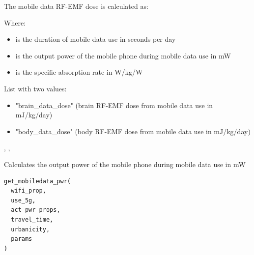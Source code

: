 \documentclass[a4paper]{book}
\begin{document}
%
\begin{Details}
The mobile data RF-EMF dose is calculated as:

Where:
\begin{itemize}

\item{}  is the duration of mobile data use in seconds per day
\item{}  is the output power of the mobile phone during mobile data use in mW
\item{}  is the specific absorption rate in W/kg/W

\end{itemize}

\end{Details}
%
\begin{Value}
List with two values:
\begin{itemize}

\item{} "brain\_data\_dose" (brain RF-EMF dose from mobile data use in mJ/kg/day)
\item{} "body\_data\_dose" (body RF-EMF dose from mobile data use in mJ/kg/day)

\end{itemize}

\end{Value}
%
\begin{SeeAlso}
, , 
\end{SeeAlso}
%
\begin{Description}
Calculates the output power of the mobile phone during mobile data use in mW
\end{Description}
%
\begin{Usage}
\begin{verbatim}
get_mobiledata_pwr(
  wifi_prop,
  use_5g,
  act_pwr_props,
  travel_time,
  urbanicity,
  params
)
\end{verbatim}
\end{Usage}
%
\end{document}
